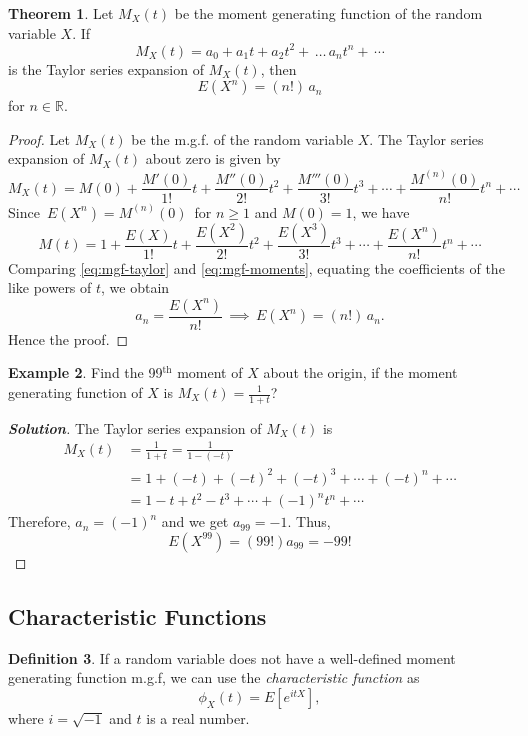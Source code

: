 \documentclass[12pt,a4paper]{report}
\theoremstyle{definition}
\newtheorem{thm}{Theorem}[section]
\newtheorem{definition}[thm]{Definition}
\newtheorem{example}[thm]{Example}
\theoremstyle{plain}
\theoremstyle{definition}
\begin{document}
\begin{thm}
Let $M_X(t)$ be the moment generating function of the random variable $X$. If \begin{equation}\label{eq:mgf-taylor}
M_X(t) = a_0 + a_1t + a_2t^2 +\, \ldots\, a_nt^n + \, \cdots
\end{equation}
is the Taylor series expansion of $M_X(t)$, then \[E(X^n) = (n!)\, a_n\] for $n \in \mathbb{R}$.
\end{thm}
\begin{proof}
Let $M_X(t)$ be the m.g.f. of the random variable $X$. The Taylor series expansion of $M_X(t)$ about zero is given by \[M_X(t) = M(0) + \frac{M'(0)}{1!}t + \frac{M''(0)}{2!}t^2+ \frac{M'''(0)}{3!}t^3 + \cdots + \frac{M^{(n)}(0)}{n!}t^n+ \cdots\]
Since $\, E(X^n) = M^{(n)}(0)\,$ for $n\geq 1$ and $M(0) = 1$, we have 
\begin{equation}\label{eq:mgf-moments}
M(t) = 1 + \frac{E(X)}{1!}t + \frac{E(X^2)}{2!}t^2 + \frac{E(X^3)}{3!}t^3 + \cdots + \frac{E(X^n)}{n!}t^n + \cdots
\end{equation}
Comparing \eqref{eq:mgf-taylor} and \eqref{eq:mgf-moments}, equating the coefficients of the like powers of $t$, we obtain \[a_n = \frac{E(X^n)}{n!}\, \implies \, E(X^n) = (n!)\, a_n.\] Hence the proof.
\end{proof}




\begin{example}
Find the 99$^{\text{th}}$ moment of $X$ about the origin, if the moment generating function of $X$ is $M_X(t) = \frac{1}{1 + t}$?
\end{example}
\begin{proof}[\textbf{\textit{Solution}}]
The Taylor series expansion of $M_X(t)$ is
\begin{align*}
M_X(t) & = \frac{1}{1+t}
 = \frac{1}{1 - (-t)}\\
& = 1 + (-t) + (-t)^2 + (-t)^3  + \cdots + (-t)^n+ \cdots\\
& = 1 - t + t^2 - t^3 + \cdots + (-1)^nt^n + \cdots
\end{align*}
Therefore, $a_n = (-1)^n$ and we get $a_{99} = -1$. Thus, \[E(X^{99}) = (99!)a_{99} = -99!\]
\end{proof}




\subsection{Characteristic Functions}
\begin{definition}
If a random variable does not have a well-defined moment generating function m.g.f, we can use the \textit{characteristic function} as \[\phi_X(t) = E\left[e^{itX}\right],\] where $i = \sqrt{-1}$ and $t$ is a real number.
\end{definition}
\end{document}

